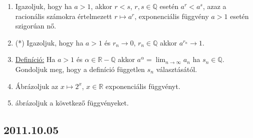 \begin{enumerate}
		\item Igazoljuk, hogy ha $a>1$, akkor $r<s$,  $r,s\in\mathbb{Q}$ esetén $a^{r}<a^{s}$, azaz a racionális számokra értelmezett $r\mapsto a^r$, exponenciális függvény $a>1$ esetén szigorúan nő.
		\item (*) Igazoljuk, hogy ha $a>1$ és $r_n\rightarrow 0$, $r_{n}\in\mathbb{Q}$ akkor $a^{r_{n}}\rightarrow  1$.
		\item \underline{Definíció:} Ha $a>1$ és $\alpha \in\mathbb{R}-\mathbb{Q}$ akkor $a^{\alpha}= \lim_{n\to \infty} a_n$ ha $s_{n}\in\mathbb{Q}$. \\ 
        Gondoljuk meg, hogy a definíció független $s_n$ választásától.
		\item Ábrázoljuk az $x\mapsto 2^{x}$, $x\in\mathbb{R}$ exponenciális függvényt.
        \item ábrázoljuk a következő függvényeket.

\end{enumerate}


\subsection*{2011.10.05}

